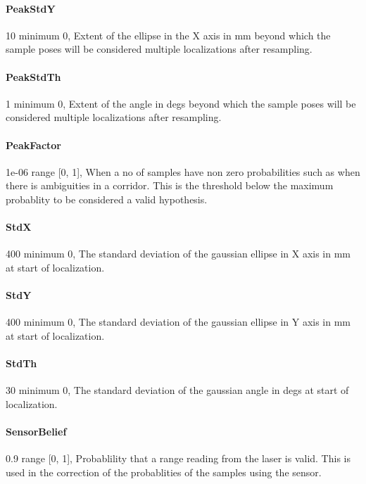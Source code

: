 \documentclass{article}
\begin{document}
\paragraph{PeakStdY} 10               minimum 0,  Extent of the ellipse in the X axis in
                          mm beyond which the sample poses will be considered
                          multiple localizations after resampling.

\paragraph{PeakStdTh} 1               minimum 0,  Extent of the angle in degs beyond which
                          the sample poses will be considered multiple
                          localizations after resampling.

\paragraph{PeakFactor} 1e-06          range [0, 1],  When a no of samples have non zero
                          probabilities such as when there is ambiguities in a
                          corridor. This is the threshold below the maximum
                          probablity to be considered a valid hypothesis.

\paragraph{StdX} 400                  minimum 0,  The standard deviation of the gaussian
                          ellipse in X axis in mm at start of localization.

\paragraph{StdY} 400                  minimum 0,  The standard deviation of the gaussian
                          ellipse in Y axis in mm at start of localization.

\paragraph{StdTh} 30                  minimum 0,  The standard deviation of the gaussian
                          angle in degs at start of localization.

\paragraph{SensorBelief} 0.9          range [0, 1],  Probablility that a range reading
                          from the laser is valid. This is used in the
                          correction of the probablities of the samples using
                          the sensor.
\end{document}
